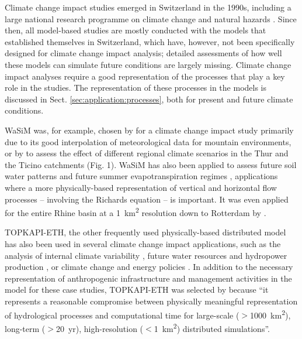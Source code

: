 \documentclass[10pt,a4paper]{article}
\begin{document}
Climate change impact studies emerged in Switzerland in the 1990s, including a large national research programme on climate change and natural hazards \citep{snfs}. Since then, all model-based studies are mostly conducted with the models that established themselves in Switzerland, which have, however, not been specifically designed for climate change impact analysis; detailed assessments of how well these models can simulate future conditions are largely missing. Climate change impact analyses require a good representation of the processes that play a key role in the studies. The representation of these processes in the models is discussed in Sect. \ref{sec:application:processes}, both for present and future climate conditions.

WaSiM was, for example, chosen by \citet{Middelkoop2001} for a climate change impact study primarily due to its good interpolation of meteorological data for mountain environments, or by \citet{Jasper2004} to assess the effect of different regional climate scenarios in the Thur and the Ticino catchments (Fig. 1). WaSiM has also been applied to assess future soil water patterns \citep{Jasper2006, Rossler2012} and future summer evapotranspiration regimes \citep{Calanca2006}, applications where a more physically-based representation of vertical and horizontal flow processes -- involving the Richards equation -- is important. It was even applied for the entire Rhine basin at a 1~km\textsuperscript{2} resolution down to Rotterdam by \citet{Kleinn_2005}.

TOPKAPI-ETH, the other frequently used physically-based distributed model has also been used in several climate change impact applications, such as the analysis of internal climate variability \citep{Fatichi2014}, future water resources and hydropower production  \citep{Finger_2012, Fatichi2015}, or climate change and energy policies
\citep{Anghileri2018}. In addition to the necessary representation of anthropogenic infrastructure and management activities in the model for these case studies, TOPKAPI-ETH was selected by \citet{Fatichi2015} because “it represents a reasonable compromise between physically meaningful representation of hydrological processes and computational time for large-scale ($>$1000~km\textsuperscript{2}), long-term ($>$20~yr), high-resolution ($<$1~km\textsuperscript{2}) distributed simulations”.
\end{document}
